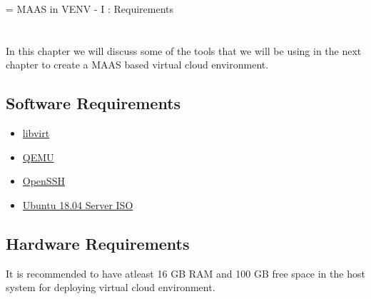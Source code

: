 \chapname = {MAAS in VENV - I : Requirements}
\chapter{\the\chapname}

In this chapter we will discuss some of the tools that we will be using in the next chapter to create a MAAS based virtual cloud environment.

\section{Software Requirements}

\begin{itemize}
    \setlength\itemsep{-1em}
    \item \href{https://libvirt.org/}{libvirt}
    \item \href{https://www.qemu.org/}{QEMU}
    \item \href{https://www.openssh.com/}{OpenSSH}
    \item \href{http://releases.ubuntu.com/18.04.3/ubuntu-18.04.3-live-server-amd64.iso}{Ubuntu 18.04 Server ISO}
\end{itemize}
\section{Hardware Requirements}

It is recommended to have atleast 16 GB RAM and 100 GB free space in the host system for deploying virtual cloud environment.